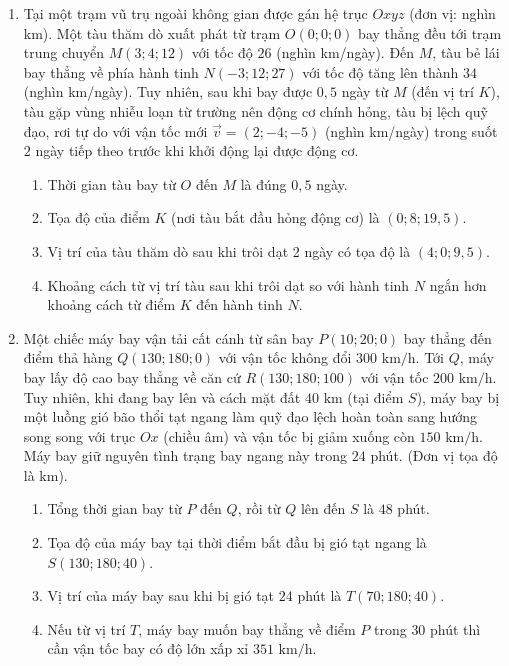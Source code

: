 \documentclass[12pt]{article}
\begin{document}
\begin{enumerate}[label=\textbf{Câu \arabic*:}, leftmargin=*]
		\vspace{3mm}
		\item Tại một trạm vũ trụ ngoài không gian được gán hệ trục $Oxyz$ (đơn vị: nghìn km). Một tàu thăm dò xuất phát từ trạm $O(0;0;0)$ bay thẳng đều tới trạm trung chuyển $M(3; 4; 12)$ với tốc độ $26$ (nghìn km/ngày). Đến $M$, tàu bẻ lái bay thẳng về phía hành tinh $N(-3; 12; 27)$ với tốc độ tăng lên thành $34$ (nghìn km/ngày). Tuy nhiên, sau khi bay được $0,5$ ngày từ $M$ (đến vị trí $K$), tàu gặp vùng nhiễu loạn từ trường nên động cơ chính hỏng, tàu bị lệch quỹ đạo, rơi tự do với vận tốc mới $\vec{v} = (2; -4; -5)$ (nghìn km/ngày) trong suốt $2$ ngày tiếp theo trước khi khởi động lại được động cơ.
		\begin{enumerate}[label=\alph*)]
			\item Thời gian tàu bay từ $O$ đến $M$ là đúng $0,5$ ngày.
			\item Tọa độ của điểm $K$ (nơi tàu bắt đầu hỏng động cơ) là $(0; 8; 19,5)$.
			\item Vị trí của tàu thăm dò sau khi trôi dạt 2 ngày có tọa độ là $(4; 0; 9,5)$.
			\item Khoảng cách từ vị trí tàu sau khi trôi dạt so với hành tinh $N$ ngắn hơn khoảng cách từ điểm $K$ đến hành tinh $N$.
		\end{enumerate}
		
		\vspace{3mm}
		\item Một chiếc máy bay vận tải cất cánh từ sân bay $P(10; 20; 0)$ bay thẳng đến điểm thả hàng $Q(130; 180; 0)$ với vận tốc không đổi $300\text{ km/h}$. Tới $Q$, máy bay lấy độ cao bay thẳng về căn cứ $R(130; 180; 100)$ với vận tốc $200\text{ km/h}$. Tuy nhiên, khi đang bay lên và cách mặt đất $40\text{ km}$ (tại điểm $S$), máy bay bị một luồng gió bão thổi tạt ngang làm quỹ đạo lệch hoàn toàn sang hướng song song với trục $Ox$ (chiều âm) và vận tốc bị giảm xuống còn $150\text{ km/h}$. Máy bay giữ nguyên tình trạng bay ngang này trong $24$ phút. (Đơn vị tọa độ là km).
		\begin{enumerate}[label=\alph*)]
			\item Tổng thời gian bay từ $P$ đến $Q$, rồi từ $Q$ lên đến $S$ là $48$ phút.
			\item Tọa độ của máy bay tại thời điểm bắt đầu bị gió tạt ngang là $S(130; 180; 40)$.
			\item Vị trí của máy bay sau khi bị gió tạt $24$ phút là $T(70; 180; 40)$.
			\item Nếu từ vị trí $T$, máy bay muốn bay thẳng về điểm $P$ trong $30$ phút thì cần vận tốc bay có độ lớn xấp xỉ $351\text{ km/h}$.
		\end{enumerate}
		

\end{enumerate}
\end{document}
